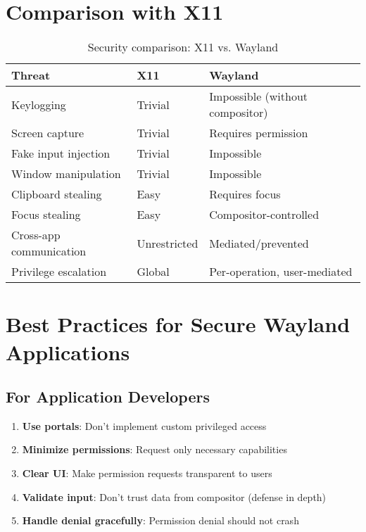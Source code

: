 \section{Comparison with X11}

\begin{table}[h]
\centering
\begin{tabular}{p{}|p{}|p{}}
\toprule
\textbf{Threat} & \textbf{X11} & \textbf{Wayland} \\
\midrule
Keylogging & Trivial & Impossible (without compositor) \\
Screen capture & Trivial & Requires permission \\
Fake input injection & Trivial & Impossible \\
Window manipulation & Trivial & Impossible \\
Clipboard stealing & Easy & Requires focus \\
Focus stealing & Easy & Compositor-controlled \\
Cross-app communication & Unrestricted & Mediated/prevented \\
Privilege escalation & Global & Per-operation, user-mediated \\
\bottomrule
\end{tabular}
\caption{Security comparison: X11 vs. Wayland}
\end{table}

\section{Best Practices for Secure Wayland Applications}

\subsection{For Application Developers}

\begin{enumerate}
    \item \textbf{Use portals}: Don't implement custom privileged access
    \item \textbf{Minimize permissions}: Request only necessary capabilities
    \item \textbf{Clear UI}: Make permission requests transparent to users
    \item \textbf{Validate input}: Don't trust data from compositor (defense in depth)
    \item \textbf{Handle denial gracefully}: Permission denial should not crash
\end{enumerate}

